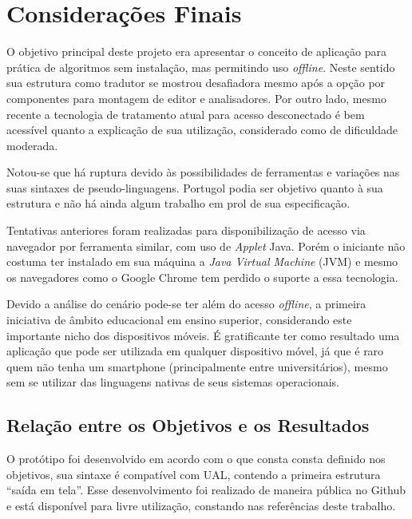 
\chapter{Considerações Finais}

O objetivo principal deste projeto era apresentar o conceito de aplicação para prática de algoritmos sem instalação, mas permitindo uso \textit{offline}. Neste sentido sua estrutura como tradutor se mostrou desafiadora mesmo após a opção por componentes para montagem de editor e analisadores. Por outro lado, mesmo recente a tecnologia de tratamento atual para acesso desconectado é bem acessível quanto a explicação de sua utilização, considerado como de dificuldade moderada.

Notou-se que há ruptura devido às possibilidades de ferramentas e variações nas suas sintaxes de pseudo-linguagens. Portugol podia ser objetivo quanto à sua estrutura e não há ainda algum trabalho em prol de sua especificação.

Tentativas anteriores foram realizadas para disponibilização de acesso via navegador por ferramenta similar, com uso de \textit{Applet} Java. Porém o iniciante não costuma ter instalado em sua máquina a \textit{Java Virtual Machine} (JVM) e mesmo os navegadores como o Google Chrome tem perdido o suporte a essa tecnologia.

Devido a análise do cenário pode-se ter além do acesso \textit{offline}, a primeira iniciativa de âmbito educacional em ensino superior, considerando este importante nicho dos dispositivos móveis. É gratificante ter como resultado uma aplicação que pode ser utilizada em qualquer dispositivo móvel, já que é raro quem não tenha um smartphone (principalmente entre universitários), mesmo sem se utilizar das linguagens nativas de seus sistemas operacionais.

\section{Relação entre os Objetivos e os Resultados}

O protótipo foi desenvolvido em acordo com o que consta consta definido nos objetivos, sua sintaxe é compatível com UAL, contendo a primeira estrutura ``saída em tela''. Esse desenvolvimento foi realizado de maneira pública no Github e está disponível para livre utilização, constando nas referências deste trabalho.


